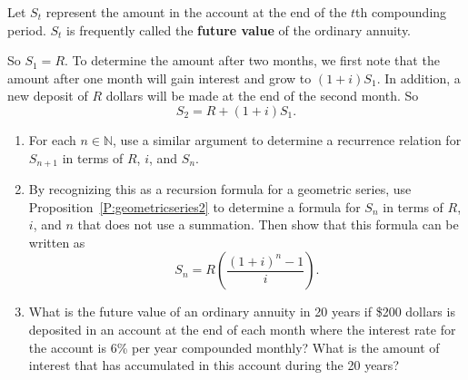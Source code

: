 \begin{enumerate}
Let  $S_t $ represent the amount in the account at the end of the  $t${th} compounding period. $S_t $ is frequently called the \textbf{future value}
%
 of the ordinary annuity.

So  $S_1  = R$.  To determine the amount after two months, we first note that the amount after one month will gain interest and grow to  $( {1 + i} )S_1 $.  In addition, a new deposit of  $R$  dollars will be made at the end of the second month.  So
\[
S_2  = R + ( {1 + i} )S_1.
\]
\begin{enumerate}
\item For each  $n \in \mathbb{N}$, use a similar argument to determine a recurrence relation for  $S_{n + 1} $ in terms of  $R$, $i$, and  $S_n $.

\item By recognizing this as a recursion formula for a geometric series, use Proposition~\ref{P:geometricseries2} to determine a formula for  $S_n $ in terms of  $R$, $i$, and  $n$  that does not use a summation.  Then show that this formula can be written as  
\[
S_n  = R\left( {\frac{{\left( {1 + i} \right)^n  - 1}}{i}} \right).
\]
\item What is the future value of an ordinary annuity in 20 years if \$200 dollars is deposited in an account at the end of each month where the interest rate for the account is 6\%  per year compounded monthly?  What is the amount of interest that has accumulated in this account during the 20 years?

\end{enumerate}
\end{enumerate}
\hbreak
\endinput
